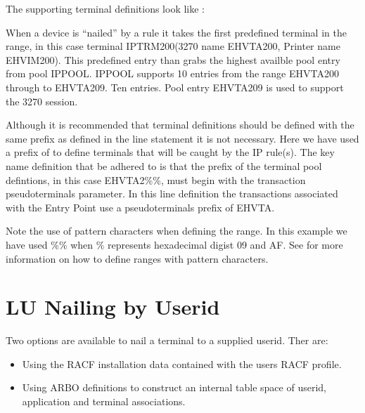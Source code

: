 \documentclass[letterpaper,10pt,english]{sphinxmanual}
\begin{document}
\sphinxAtStartPar
The supporting terminal definitions look like :\sphinxhyphen{}

\sphinxAtStartPar
{}

\sphinxAtStartPar
When a device is “nailed” by a rule it takes the first predefined terminal in the range, in this case terminal IPTRM200(3270 name EHVTA200, Printer name EHVIM200). This pre\sphinxhyphen{}defined entry than grabs the highest availble pool entry from pool IPPOOL. IPPOOL supports 10 entries from the range EHVTA200 through to EHVTA209. Ten entries. Pool entry EHVTA209 is used to support the 3270 session.

\sphinxAtStartPar
Although it is recommended that terminal definitions should be defined with the same prefix as defined in the line statement it is not necessary. Here we have used a prefix of  to define terminals that will be caught by the IP rule(s). The key name definition that  be adhered to is that the prefix of the terminal pool defintions, in this case EHVTA2\%\%, must begin with the transaction pseudo\sphinxhyphen{}terminals parameter. In this line definition the transactions associated with the Entry Point use a pseudo\sphinxhyphen{}terminals prefix of EHVTA.

\sphinxAtStartPar
Note the use of pattern characters when defining the range. In this example we have used \%\% when \% represents hexadecimal digist 0\sphinxhyphen{}9 and A\sphinxhyphen{}F. See {\hyperref[\detokenize{connectivity_guide:v462cn-patterncharacters}]{}} for more information on how to define ranges with pattern characters.

\sphinxAtStartPar
{}

\newpage

\ignorespaces 

\section{LU Nailing by Userid}
\label{\detokenize{connectivity_guide:lu-nailing-by-userid}}\label{\detokenize{connectivity_guide:index-158}}
\sphinxAtStartPar
Two options are available to nail a terminal to a supplied userid. Ther are: \sphinxhyphen{}
\begin{itemize}
\item {} 
\sphinxAtStartPar
Using the RACF installation data contained with the users RACF profile.

\item {} 
\sphinxAtStartPar
Using ARBO definitions to construct an internal table space of userid, application and terminal associations.

\end{itemize}
\end{document}
